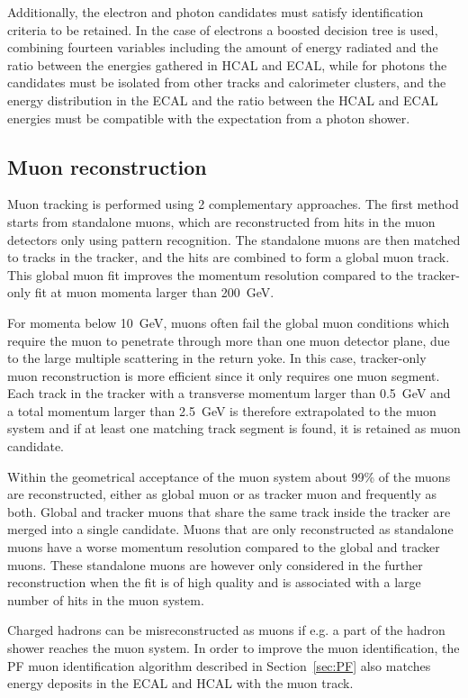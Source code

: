 Additionally, the electron and photon candidates must satisfy identification criteria to be retained. In the case of electrons a boosted decision tree is used, combining fourteen variables including the amount of energy radiated and the ratio between the energies gathered in HCAL and ECAL, while for photons the candidates must be isolated from other tracks and calorimeter clusters, and the energy distribution in the \ac{ECAL} and the ratio between the \ac{HCAL} and \ac{ECAL} energies must be compatible with the expectation from a photon shower.

\subsection{Muon reconstruction}
\label{sec:muon_reconstruction}

Muon tracking is performed using 2 complementary approaches. The first method starts from standalone muons, which are reconstructed from hits in the muon detectors only using pattern recognition. The standalone muons are then matched to tracks in the tracker, and the hits are combined to form a global muon track. This global muon fit improves the momentum resolution compared to the tracker-only fit at muon momenta larger than \SI{200}{GeV}.

For momenta below \SI{10}{GeV}, muons often fail the global muon conditions which require the muon to penetrate through more than one muon detector plane, due to the large multiple scattering in the return yoke. In this case, tracker-only muon reconstruction is more efficient since it only requires one muon segment. Each track in the tracker with a transverse momentum larger than \SI{0.5}{GeV} and a total momentum larger than \SI{2.5}{GeV} is therefore extrapolated to the muon system and if at least one matching track segment is found, it is retained as muon candidate.

Within the geometrical acceptance of the muon system about 99\% of the muons are reconstructed, either as global muon or as tracker muon and frequently as both. Global and tracker muons that share the same track inside the tracker are merged into a single candidate. Muons that are only reconstructed as standalone muons have a worse momentum resolution compared to the global and tracker muons. These standalone muons are however only considered in the further reconstruction when the fit is of high quality and is associated with a large number of hits in the muon system.

Charged hadrons can be misreconstructed as muons if e.g. a part of the hadron shower reaches the muon system. In order to improve the muon identification, the \ac{PF} muon identification algorithm described in Section~\ref{sec:PF} also matches energy deposits in the \ac{ECAL} and \ac{HCAL} with the muon track.

